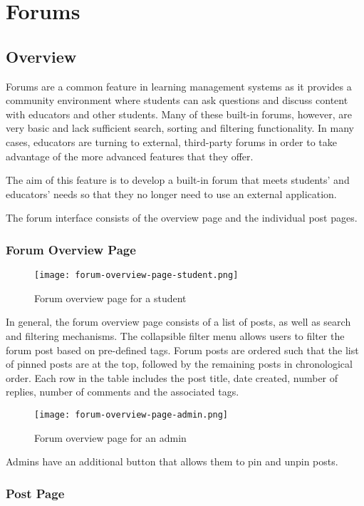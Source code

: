 \section{Forums}
\subsection{Overview}
Forums are a common feature in learning management systems as it provides a community environment where students can ask questions and discuss content with educators and other students.
Many of these built-in forums, however, are very basic and lack sufficient search, sorting and filtering functionality.
In many cases, educators are turning to external, third-party forums in order to take advantage of the more advanced features that they offer.

The aim of this feature is to develop a built-in forum that meets students' and educators' needs so that they no longer need to use an external application.

The forum interface consists of the overview page and the individual post pages.

\subsubsection{Forum Overview Page}

\begin{figure}[h!]
    \texttt{[image: forum-overview-page-student.png]}
    \centering
    \caption{Forum overview page for a student}
\end{figure}

In general, the forum overview page consists of a list of posts, as well as search and filtering mechanisms.
The collapsible filter menu allows users to filter the forum post based on pre-defined tags.
Forum posts are ordered such that the list of pinned posts are at the top, followed by the remaining posts in chronological order.
Each row in the table includes the post title, date created, number of replies, number of comments and the associated tags.

\begin{figure}[h!]
    \texttt{[image: forum-overview-page-admin.png]}
    \centering
    \caption{Forum overview page for an admin}
\end{figure}

Admins have an additional button that allows them to pin and unpin posts.

\subsubsection{Post Page}

